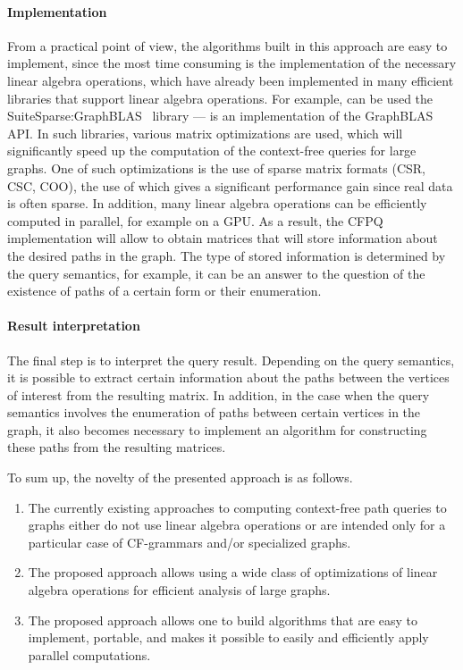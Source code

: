 \documentclass[sigconf, nonacm]{acmart}
\begin{document}
\paragraph{Implementation}
From a practical point of view, the algorithms built in this approach are easy to implement, since the most time consuming is the implementation of the necessary linear algebra operations, which have already been implemented in many efficient libraries that support linear algebra operations. For example, can be used the SuiteSparse:GraphBLAS~\cite{Davis2018Algorithm9S} library --- is an implementation of the GraphBLAS API. In such libraries, various matrix optimizations are used, which will significantly speed up the computation of the context-free queries for large graphs. One of such optimizations is the use of sparse matrix formats (CSR, CSC, COO), the use of which gives a significant performance gain since real data is often sparse. In addition, many linear algebra operations can be efficiently computed in parallel, for example on a GPU. As a result, the CFPQ implementation will allow to obtain matrices that will store information about the desired paths in the graph. The type of stored information is determined by the query semantics, for example, it can be an answer to the question of the existence of paths of a certain form or their enumeration.

\paragraph{Result interpretation} 
The final step is to interpret the query result. Depending on the query semantics, it is possible to extract certain information about the paths between the vertices of interest from the resulting matrix. In addition, in the case when the query semantics involves the enumeration of paths between certain vertices in the graph, it also becomes necessary to implement an algorithm for constructing these paths from the resulting matrices.

To sum up, the novelty of the presented approach is as follows.
\begin{enumerate}
\item The currently existing approaches to computing context-free path queries to graphs either do not use linear algebra operations or are intended only for a particular case of CF-grammars and/or specialized graphs.
\item The proposed approach allows using a wide class of optimizations of linear algebra operations for efficient analysis of large graphs.
\item The proposed approach allows one to build algorithms that are easy to implement, portable, and makes it possible to easily and efficiently apply parallel computations.
\end {enumerate}
\end{document}
